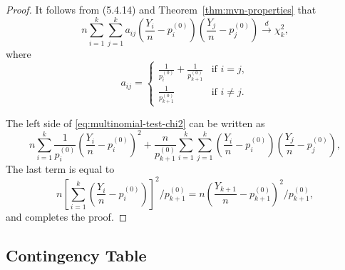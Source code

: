 \begin{proof}
	It follows from (5.4.14) and Theorem~\ref{thm:mvn-properties} that
	\begin{equation}
		\label{eq:multinomial-test-chi2}
		n\sum_{i=1}^{k}\sum_{j=1}^{k}a_{ij}\left(\frac{Y_i}{n}-p_i^{(0)}\right)\left(\frac{Y_j}{n}-p_j^{(0)}\right)\stackrel{d}{\rightarrow}\chi_k^2,
	\end{equation}
	where
	\begin{equation*}
		a_{ij}=\begin{cases}
			\frac{1}{p_{i}^{(0)}}+\frac{1}{p_{k+1}^{(0)}} & \text{if }i=j,     \\
			\frac{1}{p_{k+1}^{(0)}}                       & \text{if }i\neq j.
		\end{cases}
	\end{equation*}

	The left side of \eqref{eq:multinomial-test-chi2} can be written as
	\begin{equation*}
		n\sum_{i=1}^{k}\frac{1}{p_i^{(0)}}\left(\frac{Y_i}{n}-p_i^{(0)}\right)^2+\frac{n}{p_{k+1}^{(0)}}\sum_{i=1}^{k}\sum_{j=1}^k\left(\frac{Y_i}{n}-p_i^{(0)}\right)\left(\frac{Y_j}{n}-p_j^{(0)}\right),
	\end{equation*}
	The last term is equal to
	\begin{equation*}
		n\left[\sum_{i=1}^k\left(\frac{Y_i}{n}-p_i^{(0)}\right)\right]^2/p_{k+1}^{(0)}=n\left(\frac{Y_{k+1}}{n}-p_{k+1}^{(0)}\right)^2/p_{k+1}^{(0)},
	\end{equation*}
	and completes the proof.
\end{proof}

\subsection{Contingency Table}
